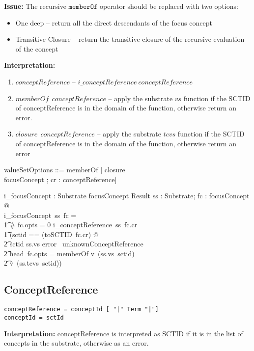 \documentclass{article}
\begin{document}
\textbf{Issue:} The recursive $\mathtt{memberOf}$ operator should be replaced with two options:
\begin{itemize}[noitemsep,nolistsep]
\item One deep -- return all the direct descendants of the focus concept
\item Transitive Closure -- return the transitive closure of the recursive evaluation of the concept
\end{itemize}

\noindent
\textbf{Interpretation:}
\begin{enumerate}
\item{$conceptReference$} -- $i\_conceptReference~conceptReference$
\item{$memberOf~~conceptReference$} -- apply the substrate $vs$ function if the SCTID of conceptReference
is in the domain of the function, otherwise return an error.
\item{$closure~~ conceptReference$} -- apply the substrate $tcvs$ function if the SCTID of conceptReference is
in the domain of the function, otherwise return an error
\end{enumerate}

\begin{zed}
valueSetOptions ::= memberOf | closure \\
focusConcept \defs [ opts : \optional[valueSetOptions]; cr : conceptReference]
\end{zed}

\begin{gendef}
   i\_focusConcept : Substrate \fun focusConcept  \fun Result 
\where
   \forall ss : Substrate;  fc : focusConcept @ \\
 i\_focusConcept~ss~fc = \\
\t1 \IF \# fc.opts = 0 \THEN i\_conceptReference~ss~fc.cr \\
\t1 \ELSE (\LET sctid == (toSCTID~fc.cr) @ \\
\t2 \IF sctid \notin \dom ss.vs \THEN error~ unknownConceptReference \\
\t2 \ELSE \IF head~fc.opts = memberOf \THEN v~(ss.vs~sctid) \\
\t2 \ELSE v~(ss.tcvs~sctid))
\end{gendef}

\subsection{ConceptReference}
\begin{verbatim}
conceptReference = conceptId [ "|" Term "|"]
conceptId = sctId
\end{verbatim}
\textbf{Interpretation:}  conceptReference is interpreted as SCTID if it is in the list of concepts
in the substrate, otherwise as an error.
\end{document}
